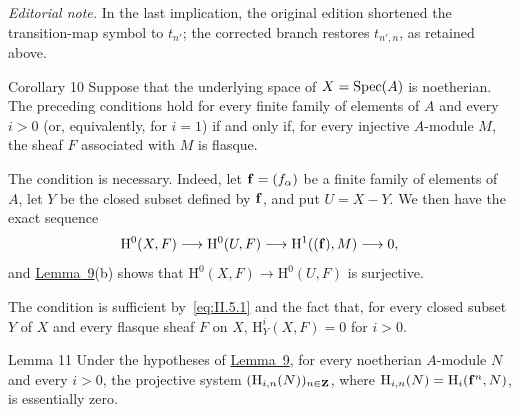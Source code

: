 \noindent\textit{Editorial note.} In the last implication, the original
edition shortened the transition-map symbol to $t_{n'}$; the corrected
branch restores $t_{n',n}$, as retained above.

\begin{sgastatement}{Corollary 10}
Suppose that the underlying space of $X=\operatorname{Spec}(A)$ is noetherian. The
preceding conditions hold for every finite family of elements of $A$ and
every $i>0$ (or, equivalently, for $i=1$) if and only if, for every injective
$A$-module $M$, the sheaf $F$ associated with $M$ is flasque.
\end{sgastatement}

The condition is necessary. Indeed, let $\mathbf f=(f_\alpha)$ be a finite family
of elements of $A$, let $Y$ be the closed subset defined by $\mathbf f$, and put
$U=X-Y$. We then have the exact sequence
\[
  \mathrm H^0(X,F)\longrightarrow \mathrm H^0(U,F)
  \longrightarrow \mathrm H^1((\mathbf f),M)\longrightarrow0,
\]
and \hyperref[II.9]{Lemma~9}(b) shows that
$\mathrm H^0(X,F)\to\mathrm H^0(U,F)$ is surjective.

The condition is sufficient by~\eqref{eq:II.5.1} and the fact
that, for every closed subset $Y$ of $X$ and every flasque sheaf $F$ on $X$,
$\mathrm H_Y^i(X,F)=0$ for $i>0$.

\begin{sgastatement}{Lemma 11}
Under the hypotheses of \hyperref[II.9]{Lemma~9}, for every noetherian $A$-module $N$ and
every $i>0$, the projective system
$(\mathrm H_{i,n}(N))_{n\in\mathbf Z}$, where
$\mathrm H_{i,n}(N)=\mathrm H_i(\mathbf f^n,N)$, is essentially zero.
\end{sgastatement}

